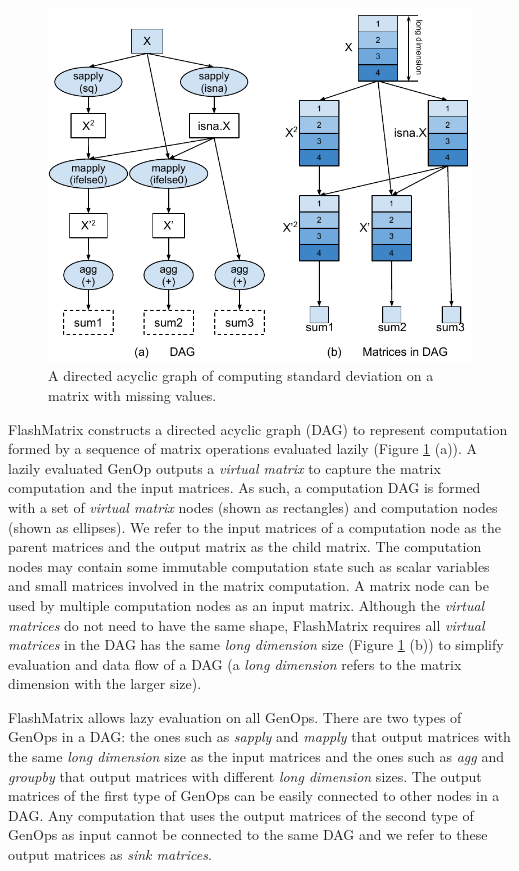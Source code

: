 \begin{figure}
	\centering
	\includegraphics[scale=0.7]{./sd.pdf}
	\caption{A directed acyclic graph of computing standard deviation on
	a matrix with missing values.}
	\label{fig:DAG}
\end{figure}

FlashMatrix constructs a directed acyclic graph (DAG) to represent
computation formed by a sequence of matrix operations evaluated lazily
(Figure \ref{fig:DAG} (a)). A lazily evaluated GenOp outputs a \textit{virtual matrix}
to capture the matrix computation and the input matrices. As such, a computation
DAG is formed with a set of \textit{virtual matrix} nodes (shown as rectangles)
and computation nodes (shown as ellipses). We refer to the input matrices of
a computation node as the parent matrices and the output matrix as the child matrix.
The computation nodes may contain some immutable computation state such as
scalar variables and small matrices involved in the matrix computation.
A matrix node can be used by multiple computation nodes as
an input matrix. Although the \textit{virtual matrices} do not need to have
the same shape, FlashMatrix requires all \textit{virtual matrices} in the DAG
has the same \textit{long dimension} size (Figure \ref{fig:DAG} (b)) to
simplify evaluation and data flow of a DAG (a \textit{long dimension}
refers to the matrix dimension with the larger size).

FlashMatrix allows lazy evaluation on all GenOps. There are two types of GenOps
in a DAG: the ones such as \textit{sapply} and \textit{mapply} that output
matrices with the same \textit{long dimension} size as the input matrices
and the ones such as \textit{agg} and \textit{groupby} that output matrices
with different \textit{long dimension} sizes. The output matrices of the first
type of GenOps can be easily connected to other nodes in a DAG. Any computation
that uses the output matrices of the second type of GenOps as input cannot be
connected to the same DAG and we refer to these output matrices as
\textit{sink matrices}.

